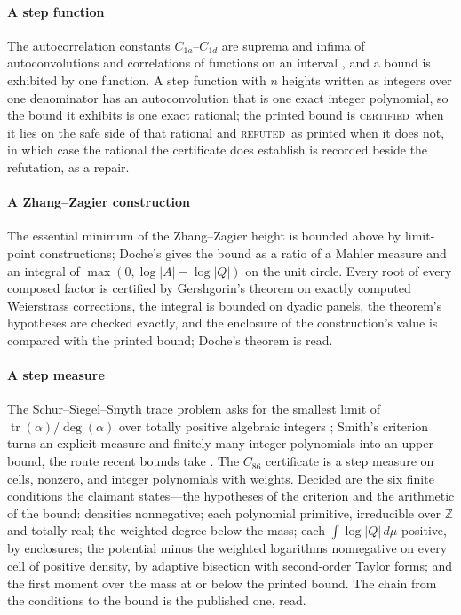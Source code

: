 \documentclass[preprint,11pt,authoryear,a4paper]{elsarticle}
\newcommand{\vword}[1]{{\normalfont\scshape #1}}
\newcommand{\vC}{\vword{certified}}
\newcommand{\vR}{\vword{refuted}}
\newcommand{\Z}{\mathbb{Z}}
\begin{document}
\paragraph{A step function} The autocorrelation constants $C_{1a}$--$C_{1d}$ are suprema and infima of autoconvolutions and correlations of functions on an interval \citep{MatolcsiVinuesa10,CloningerSteinerberger17,BarnardSteinerberger20}, and a bound is exhibited by one function. A step function with $n$ heights written as integers over one denominator has an autoconvolution that is one exact integer polynomial, so the bound it exhibits is one exact rational; the printed bound is \vC\ when it lies on the safe side of that rational and \vR\ as printed when it does not, in which case the rational the certificate does establish is recorded beside the refutation, as a repair.

\paragraph{A Zhang--Zagier construction} The essential minimum of the Zhang--Zagier height \citep{Zhang92,Zagier93} is bounded above by limit-point constructions; Doche's \citep{Doche00} gives the bound as a ratio of a Mahler measure and an integral of $\max(0, \log\lvert A\rvert - \log\lvert Q\rvert)$ on the unit circle. Every root of every composed factor is certified by Gershgorin's theorem on exactly computed Weierstrass corrections, the integral is bounded on dyadic panels, the theorem's hypotheses are checked exactly, and the enclosure of the construction's value is compared with the printed bound; Doche's theorem is read.

\paragraph{A step measure} The Schur--Siegel--Smyth trace problem asks for the smallest limit of $\operatorname{tr}(\alpha)/\deg(\alpha)$ over totally positive algebraic integers \citep{Smyth84}; Smith's criterion \citep{Smith24} turns an explicit measure and finitely many integer polynomials into an upper bound, the route recent bounds take \citep{OrloskiSardari23}. The $C_{86}$ certificate is a step measure on \OcTraceCells{} cells, \OcTraceNonzero{} nonzero, and \OcTracePolys{} integer polynomials with weights. Decided are the six finite conditions the claimant states---the hypotheses of the criterion and the arithmetic of the bound: densities nonnegative; each polynomial primitive, irreducible over $\Z$ and totally real; the weighted degree below the mass; each $\int \log\lvert Q\rvert\,d\mu$ positive, by enclosures; the potential minus the weighted logarithms nonnegative on every cell of positive density, by adaptive bisection with second-order Taylor forms; and the first moment over the mass at or below the printed bound. The chain from the conditions to the bound is the published one, read.
\end{document}

